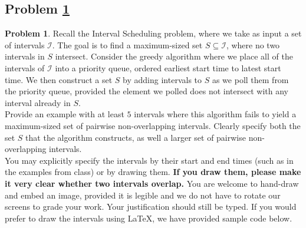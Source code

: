 \documentclass[11pt]{article}
\theoremstyle{definition}
\theoremstyle{definition}
\newtheorem{required}{Problem}
\theoremstyle{definition}
\newcommand{\interval}[4]{\draw (#2, #1) -- (#3, #1); %
\draw (#2, #1-0.11) -- (#2, #1+0.11); %
\draw (#3, #1-0.11) -- (#3, #1+0.11); %
\node[] at (#2-0.25, #1) {#4};
}
\begin{document}
\subsection{Problem \ref{GreedyFail1}}
\begin{required} \label{GreedyFail1}
Recall the \textsf{Interval Scheduling} problem, where we take as input a set of intervals $\mathcal{I}$. The goal is to find a maximum-sized set $S \subseteq \mathcal{I}$, where no two intervals in $S$ intersect. Consider the greedy algorithm where we place all of the intervals of $\mathcal{I}$ into a priority queue, ordered earliest start time to latest start time. We then construct a set $S$ by adding intervals to $S$ as we poll them from the priority queue, provided the element we polled does not intersect with any interval already in $S$. \\

\noindent Provide an example with at least $5$ intervals where this algorithm fails to yield a maximum-sized set of pairwise non-overlapping intervals. Clearly specify both the set $S$ that the algorithm constructs, as well a larger set of pairwise non-overlapping intervals. \\

\noindent You may explicitly specify the intervals by their start and end times (such as in the examples from class) or by drawing them. \textbf{If you draw them, please make it very clear whether two intervals overlap.} You are welcome to hand-draw and embed an image, provided it is legible and we do not have to rotate our screens to grade your work. Your justification should still be typed. If you would prefer to draw the intervals using \LaTeX, we have provided sample code below.
\end{required}


\end{document}
